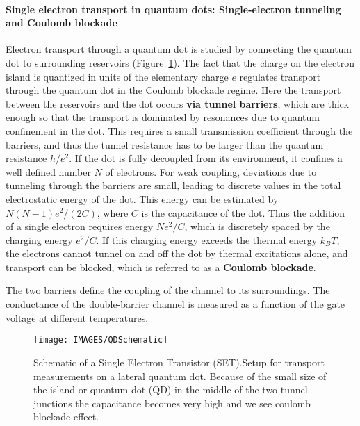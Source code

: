 \paragraph{Single electron transport in quantum dots: Single-electron tunneling and Coulomb blockade}
Electron transport through a quantum dot is studied by connecting the quantum dot to surrounding reservoirs (Figure~\ref{fig:schemaQD}). The fact that the charge on the electron island is quantized in units of the elementary charge $e$ regulates transport through the quantum dot in the Coulomb blockade regime. Here the transport between the reservoirs and the dot occurs \textbf{via tunnel barriers}, which are thick enough so that the transport is dominated by resonances due to quantum confinement in the dot. This requires a small transmission coefficient through the barriers, and thus the tunnel resistance has to be larger than the quantum resistance $h/e^2$. If the dot is fully decoupled from its environment, it confines a well defined number $N$ of electrons. For weak coupling, deviations due to tunneling through the barriers are small, leading to discrete values in the total electrostatic energy of the dot. This energy can be estimated by $N(N-1)e^2 /(2C)$, where $C$ is the capacitance of the dot. Thus the addition of a single electron requires energy $Ne^2 /C$, which is discretely spaced by the charging energy $e^2 /C$. If this charging energy exceeds the thermal energy $k_B T$, the electrons cannot tunnel on and off the dot by thermal excitations alone, and transport can be blocked, which is referred to as a \textbf{Coulomb blockade}.

The two barriers define the coupling of the channel to its surroundings. The conductance of the double-barrier channel is measured as a function of the gate voltage at different temperatures.


\begin{figure}
\centering
\texttt{[image: IMAGES/QDSchematic]}
\caption{Schematic of a Single Electron Transistor (SET).\newline Setup for transport measurements on a lateral quantum dot. Because of the small size of the island or quantum dot (QD) in the middle of the two tunnel junctions the capacitance becomes very high and we see coulomb blockade effect.}
\label{fig:schemaQD}
\end{figure}


